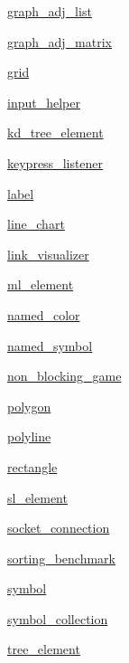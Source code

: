 \begin{DoxyCompactItemize}
 \hyperlink{namespacebridges_1_1graph__adj__list}{graph\+\_\+adj\+\_\+list}
\item 
 \hyperlink{namespacebridges_1_1graph__adj__matrix}{graph\+\_\+adj\+\_\+matrix}
\item 
 \hyperlink{namespacebridges_1_1grid}{grid}
\item 
 \hyperlink{namespacebridges_1_1input__helper}{input\+\_\+helper}
\item 
 \hyperlink{namespacebridges_1_1kd__tree__element}{kd\+\_\+tree\+\_\+element}
\item 
 \hyperlink{namespacebridges_1_1keypress__listener}{keypress\+\_\+listener}
\item 
 \hyperlink{namespacebridges_1_1label}{label}
\item 
 \hyperlink{namespacebridges_1_1line__chart}{line\+\_\+chart}
\item 
 \hyperlink{namespacebridges_1_1link__visualizer}{link\+\_\+visualizer}
\item 
 \hyperlink{namespacebridges_1_1ml__element}{ml\+\_\+element}
\item 
 \hyperlink{namespacebridges_1_1named__color}{named\+\_\+color}
\item 
 \hyperlink{namespacebridges_1_1named__symbol}{named\+\_\+symbol}
\item 
 \hyperlink{namespacebridges_1_1non__blocking__game}{non\+\_\+blocking\+\_\+game}
\item 
 \hyperlink{namespacebridges_1_1polygon}{polygon}
\item 
 \hyperlink{namespacebridges_1_1polyline}{polyline}
\item 
 \hyperlink{namespacebridges_1_1rectangle}{rectangle}
\item 
 \hyperlink{namespacebridges_1_1sl__element}{sl\+\_\+element}
\item 
 \hyperlink{namespacebridges_1_1socket__connection}{socket\+\_\+connection}
\item 
 \hyperlink{namespacebridges_1_1sorting__benchmark}{sorting\+\_\+benchmark}
\item 
 \hyperlink{namespacebridges_1_1symbol}{symbol}
\item 
 \hyperlink{namespacebridges_1_1symbol__collection}{symbol\+\_\+collection}
\item 
 \hyperlink{namespacebridges_1_1tree__element}{tree\+\_\+element}
\end{DoxyCompactItemize}
